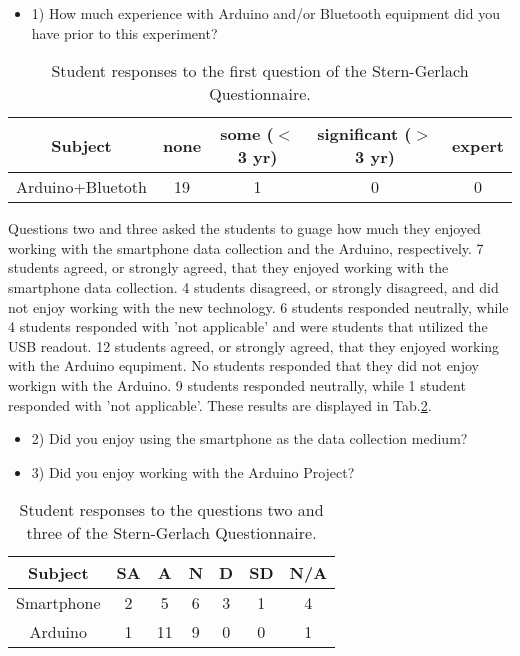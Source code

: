 \begin{table}[htpb]
  \scriptsize
  \begin{center}
    \caption{\scriptsize Student responses to the first question of the Stern-Gerlach Questionnaire.}
    \label{tab:t14q1}
    \begin{itemize}
    \item 1) How much experience with Arduino and/or Bluetooth equipment did you have prior to this experiment?
    \end{itemize}
    

    \begin{tabular}{|c | c | c | c | c |}
      \hline
      Subject & none & some ($<$ 3 yr) & significant  ($>$ 3 yr) & expert\\
      \hline
      Arduino+Bluetoth & 19 & 1 & 0 & 0\\
      \hline
    \end{tabular}
  \end{center}%
\end{table}

Questions two and three asked the students to guage how much they enjoyed working with the smartphone data collection and the Arduino, respectively.
7 students agreed, or strongly agreed, that they enjoyed working with the smartphone data collection.
4 students disagreed, or strongly disagreed, and did not enjoy working with the new technology.
6 students responded neutrally, while 4 students responded with 'not applicable' and were students that utilized the USB readout.
12 students agreed, or strongly agreed, that they enjoyed working with the Arduino equpiment.
No students responded that they did not enjoy workign with the Arduino.
9 students responded neutrally, while 1 student responded with 'not applicable'.
These results are displayed in Tab.\ref{tab:t14q23}.

\begin{table}[htpb]
  \scriptsize
  \begin{center}
    \caption{\scriptsize Student responses to the questions two and three of the Stern-Gerlach Questionnaire.}
    \label{tab:t14q23}
    \begin{itemize}
    \item 2) Did you enjoy using the smartphone as the data collection medium?
    \item 3) Did you enjoy working with the Arduino Project?
    \end{itemize}
    

    \begin{tabular}{|c | c | c | c | c | c | c|}
      \hline
      Subject & SA & A & N & D & SD & N/A\\
      \hline
      Smartphone & 2 & 5 & 6 & 3 & 1 & 4\\
      \hline
      Arduino & 1 & 11 & 9 & 0 & 0 & 1\\
      \hline
    \end{tabular}
  \end{center}%
\end{table}

